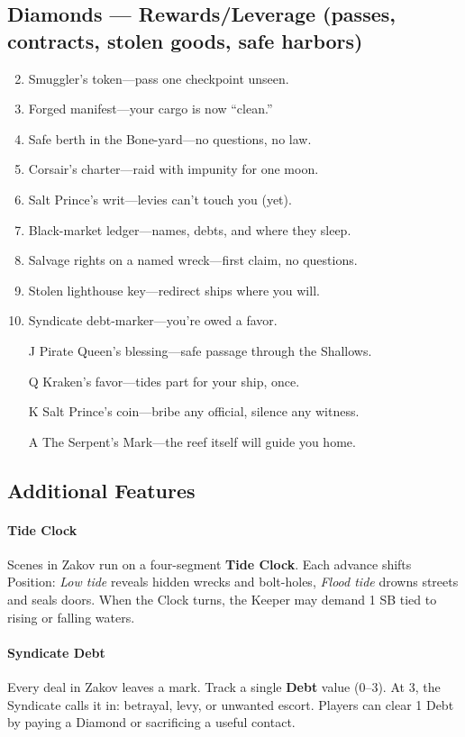 \subsection*{Diamonds --- Rewards/Leverage (passes, contracts, stolen goods, safe harbors)}
\begin{enumerate}
\setcounter{enumi}{1}
\item Smuggler's token---pass one checkpoint unseen.
\item Forged manifest---your cargo is now ``clean.''
\item Safe berth in the Bone-yard---no questions, no law.
\item Corsair's charter---raid with impunity for one moon.
\item Salt Prince's writ---levies can't touch you (yet).
\item Black-market ledger---names, debts, and where they sleep.
\item Salvage rights on a named wreck---first claim, no questions.
\item Stolen lighthouse key---redirect ships where you will.
\item Syndicate debt-marker---you're owed a favor.
\item[J] Pirate Queen's blessing---safe passage through the Shallows.
\item[Q] Kraken's favor---tides part for your ship, once.
\item[K] Salt Prince's coin---bribe any official, silence any witness.
\item[A] The Serpent's Mark---the reef itself will guide you home.
\end{enumerate}

\subsection*{Additional Features}
\label{sec:zakov-features}

\paragraph{Tide Clock}
Scenes in Zakov run on a four-segment \textbf{Tide Clock}. Each advance shifts Position:  
\emph{Low tide} reveals hidden wrecks and bolt-holes,  
\emph{Flood tide} drowns streets and seals doors.  
When the Clock turns, the Keeper may demand 1 SB tied to rising or falling waters.

\paragraph{Syndicate Debt}
Every deal in Zakov leaves a mark. Track a single \textbf{Debt} value (0--3). At 3, the Syndicate calls it in: betrayal, levy, or unwanted escort. Players can clear 1 Debt by paying a Diamond or sacrificing a useful contact.

